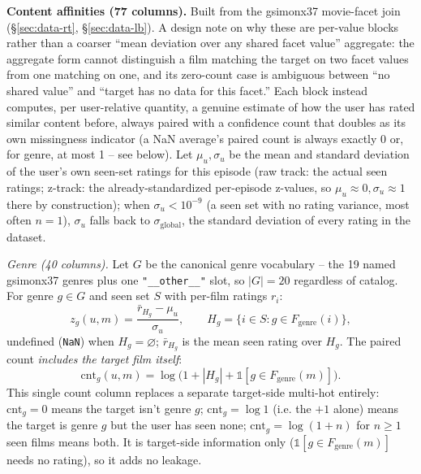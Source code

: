 \documentclass[11pt]{article}
\begin{document}
\textbf{Content affinities (77 columns).} Built from the gsimonx37 movie-facet join (\S\ref{sec:data-rt}, \S\ref{sec:data-lb}). A design note on why these are per-value blocks rather than a coarser ``mean deviation over any shared facet value'' aggregate: the aggregate form cannot distinguish a film matching the target on two facet values from one matching on one, and its zero-count case is ambiguous between ``no shared value'' and ``target has no data for this facet.'' Each block instead computes, per user-relative quantity, a genuine estimate of how the user has rated similar content before, always paired with a confidence count that doubles as its own missingness indicator (a NaN average's paired count is always exactly 0 or, for genre, at most 1 -- see below). Let $\mu_u,\sigma_u$ be the mean and standard deviation of the user's own seen-set ratings for this episode (raw track: the actual seen ratings; z-track: the already-standardized per-episode z-values, so $\mu_u\approx0,\sigma_u\approx1$ there by construction); when $\sigma_u<10^{-9}$ (a seen set with no rating variance, most often $n=1$), $\sigma_u$ falls back to $\sigma_{\text{global}}$, the standard deviation of every rating in the dataset.

\emph{Genre (40 columns).} Let $G$ be the canonical genre vocabulary -- the 19 named gsimonx37 genres plus one \texttt{"\_\_other\_\_"} slot, so $|G|=20$ regardless of catalog. For genre $g\in G$ and seen set $S$ with per-film ratings $r_i$:
\begin{equation}
z_g(u,m)=\frac{\bar r_{H_g}-\mu_u}{\sigma_u},\qquad H_g=\{i\in S: g\in F_{\text{genre}}(i)\},
\label{eq:genrez}
\end{equation}
undefined (\texttt{NaN}) when $H_g=\varnothing$; $\bar r_{H_g}$ is the mean seen rating over $H_g$. The paired count \emph{includes the target film itself}:
\begin{equation}
\mathrm{cnt}_g(u,m)=\log\!\bigl(1+|H_g|+\mathbb{1}[g\in F_{\text{genre}}(m)]\bigr).
\label{eq:genrecnt}
\end{equation}
This single count column replaces a separate target-side multi-hot entirely: $\mathrm{cnt}_g=0$ means the target isn't genre $g$; $\mathrm{cnt}_g=\log 1$ (i.e. the $+1$ alone) means the target is genre $g$ but the user has seen none; $\mathrm{cnt}_g=\log(1+n)$ for $n\geq1$ seen films means both. It is target-side information only ($\mathbb{1}[g\in F_{\text{genre}}(m)]$ needs no rating), so it adds no leakage.
\end{document}
